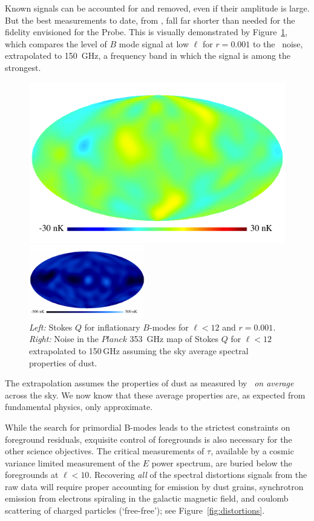 Known signals can be accounted for and removed, even if their amplitude is large. 
But the best measurements to date, from \planck , fall far shorter than needed for the fidelity 
envisioned for the Probe. This is visually demonstrated by Figure~\ref{fig:Qrp001}, which 
compares the level of $B$ mode signal at low $\ell$ for $r = 0.001$ to the \planck\ noise, 
extrapolated to 150~GHz, a frequency band in which the signal is among the strongest. 
\begin{figure}[ht!]
\hspace{-0.1in}
\parbox{2.in}{\centerline {
\includegraphics[width=2.in]{Figures/P15_2_12_rp001.pdf} } }
\hspace{0.in}
\parbox{2.0in}{\centerline { 
\includegraphics[width=2.0in]{Figures/P353_N_2_12.pdf} } }
\hspace{0.in}
\parbox{2.4in} { 
\caption{ \footnotesize \setlength{\baselineskip}{0.95\baselineskip}
{\it Left:} Stokes $Q$ for inflationary $B$-modes for $\ell<12$ and $r=0.001$. 
 {\it Right:} Noise in the $Planck$ 353~GHz map of Stokes $Q$ for $\ell<12$ 
 extrapolated to 150\,GHz assuming the sky average spectral properties of dust. 
\label{fig:Qrp001}  }  }
\vspace{-0.05in}
\end{figure}

The extrapolation assumes the properties of dust as measured by \planck\ {\it on average} across
the sky. We now know that these average properties are, as expected from fundamental physics, 
only approximate. 

While the search for primordial B-modes leads to the strictest constraints on foreground residuals, 
exquisite control of foregrounds is also necessary for the other science objectives. 
The critical measurements of $\tau$, available by a cosmic variance limited measurement of the $E$
power spectrum, are buried below the foregrounds at $\ell < 10$.  
Recovering {\it all} of the spectral distortions signals from the raw data will require proper accounting 
for emission by dust grains, synchrotron emission from electrons spiraling in the galactic magnetic 
field, and coulomb scattering of charged particles (`free-free'); see Figure~\ref{fig:distortions}.   


